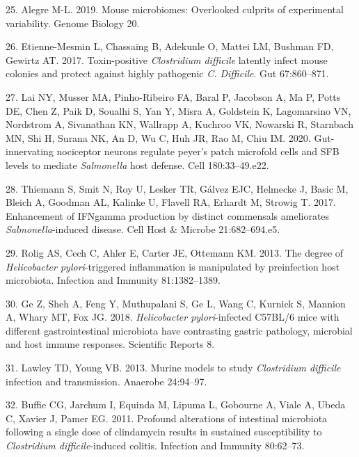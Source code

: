 \documentclass[
  11pt,
]{article}
\begin{document}
\leavevmode\hypertarget{ref-Alegre2019}{}%
25. Alegre M-L. 2019. Mouse microbiomes: Overlooked culprits of
experimental variability. Genome Biology 20.

\leavevmode\hypertarget{ref-EtienneMesmin2017}{}%
26. Etienne-Mesmin L, Chassaing B, Adekunle O, Mattei LM, Bushman FD,
Gewirtz AT. 2017. Toxin-positive \emph{Clostridium difficile} latently
infect mouse colonies and protect against highly pathogenic \emph{C.
Difficile}. Gut 67:860--871.

\leavevmode\hypertarget{ref-Lai2020}{}%
27. Lai NY, Musser MA, Pinho-Ribeiro FA, Baral P, Jacobson A, Ma P,
Potts DE, Chen Z, Paik D, Soualhi S, Yan Y, Misra A, Goldstein K,
Lagomarsino VN, Nordstrom A, Sivanathan KN, Wallrapp A, Kuchroo VK,
Nowarski R, Starnbach MN, Shi H, Surana NK, An D, Wu C, Huh JR, Rao M,
Chiu IM. 2020. Gut-innervating nociceptor neurons regulate peyer's patch
microfold cells and SFB levels to mediate \emph{Salmonella} host
defense. Cell 180:33--49.e22.

\leavevmode\hypertarget{ref-Thiemann2017}{}%
28. Thiemann S, Smit N, Roy U, Lesker TR, Gálvez EJC, Helmecke J, Basic
M, Bleich A, Goodman AL, Kalinke U, Flavell RA, Erhardt M, Strowig T.
2017. Enhancement of IFNgamma production by distinct commensals
ameliorates \emph{Salmonella}-induced disease. Cell Host \& Microbe
21:682--694.e5.

\leavevmode\hypertarget{ref-Rolig2013}{}%
29. Rolig AS, Cech C, Ahler E, Carter JE, Ottemann KM. 2013. The degree
of \emph{Helicobacter pylori}-triggered inflammation is manipulated by
preinfection host microbiota. Infection and Immunity 81:1382--1389.

\leavevmode\hypertarget{ref-Ge2018}{}%
30. Ge Z, Sheh A, Feng Y, Muthupalani S, Ge L, Wang C, Kurnick S,
Mannion A, Whary MT, Fox JG. 2018. \emph{Helicobacter pylori}-infected
C57BL/6 mice with different gastrointestinal microbiota have contrasting
gastric pathology, microbial and host immune responses. Scientific
Reports 8.

\leavevmode\hypertarget{ref-Lawley2013}{}%
31. Lawley TD, Young VB. 2013. Murine models to study \emph{Clostridium
difficile} infection and transmission. Anaerobe 24:94--97.

\leavevmode\hypertarget{ref-Buffie2011}{}%
32. Buffie CG, Jarchum I, Equinda M, Lipuma L, Gobourne A, Viale A,
Ubeda C, Xavier J, Pamer EG. 2011. Profound alterations of intestinal
microbiota following a single dose of clindamycin results in sustained
susceptibility to \emph{Clostridium difficile}-induced colitis.
Infection and Immunity 80:62--73.
\end{document}
